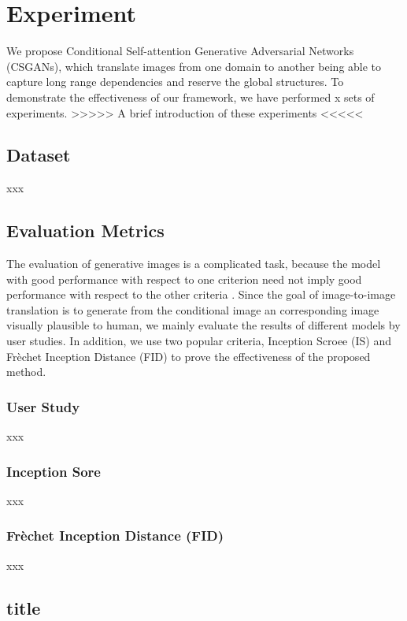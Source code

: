 \section{Experiment}
We propose Conditional Self-attention Generative Adversarial Networks (CSGANs), which translate images from one domain to another being able to capture long range dependencies and reserve the global structures. To demonstrate the effectiveness of our framework, we have performed x sets of experiments. >>>>> A brief introduction of these experiments <<<<< 
\subsection{Dataset}
xxx
%
%
\subsection{ Evaluation Metrics}
The evaluation of generative images is a complicated task, because the model with good performance with respect to one criterion need not imply good performance with respect to the other criteria \cite{evaluation, GANs_equal}. Since the goal of image-to-image translation is to generate from the conditional image an corresponding image visually plausible to human, we mainly evaluate the results of different models by user studies. In addition, we use two popular criteria, Inception Scroee (IS) and Frèchet Inception Distance (FID) to prove the effectiveness of the proposed method.
\subsubsection{User Study}
xxx
\subsubsection{Inception Sore}
xxx
\subsubsection{Frèchet Inception Distance (FID)}
xxx
%
%
\subsection{title}
